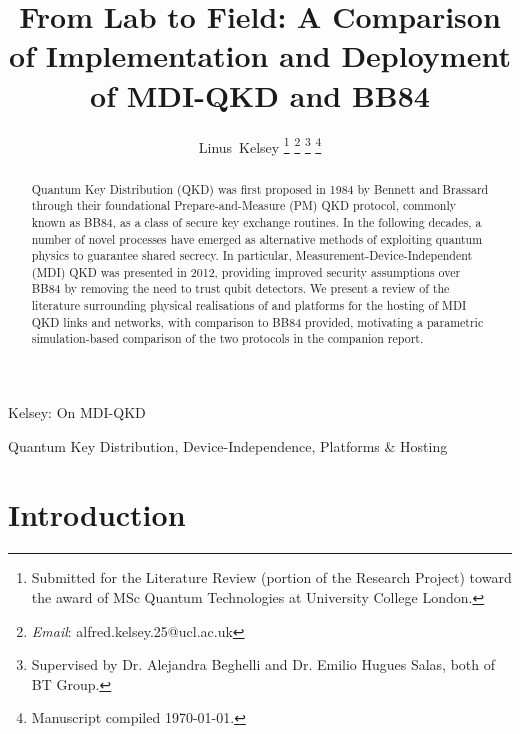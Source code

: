 \documentclass[9pt,technote]{IEEEtran}
\begin{document}
\title{From Lab to Field: A Comparison of Implementation and Deployment of MDI-QKD and BB84}

\author{Linus~Kelsey%
\thanks{Submitted for the Literature Review (portion of the Research Project) toward the award of MSc Quantum Technologies at University College London.}%
\thanks{\textit{Email}: alfred.kelsey.25@ucl.ac.uk}%
\thanks{Supervised by Dr. Alejandra Beghelli and Dr. Emilio Hugues Salas, both of BT Group.}%
\thanks{Manuscript compiled \today.}}


%
{Kelsey: On MDI-QKD}

\maketitle

\begin{abstract}
Quantum Key Distribution (QKD) was first proposed in 1984 by Bennett and Brassard through their foundational Prepare-and-Measure (PM) QKD protocol, commonly known as BB84, as a class of secure key exchange routines. In the following decades, a number of novel processes have emerged as alternative methods of exploiting quantum physics to guarantee shared secrecy. In particular, Measurement-Device-Independent (MDI) QKD was presented in 2012, providing improved security assumptions over BB84 by removing the need to trust qubit detectors. We present a review of the literature surrounding physical realisations of and platforms for the hosting of MDI QKD links and networks, with comparison to BB84 provided, motivating a parametric simulation-based comparison of the two protocols in the companion report.
\end{abstract}

\begin{IEEEkeywords}
Quantum Key Distribution, Device-Independence, Platforms \& Hosting
\end{IEEEkeywords}


\section{Introduction}
\end{document}

